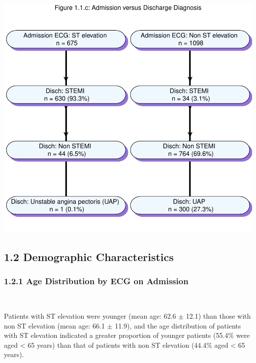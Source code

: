 \documentclass[
]{article}
\begin{document}
~

\includegraphics{‏‏ACSIS_2024_v1_with_trend_pdf_files/figure-latex/unnamed-chunk-8-1.pdf}

\pagebreak

\subsection{1.2 Demographic
Characteristics}\label{demographic-characteristics}

\subsubsection{1.2.1 Age Distribution by ECG on
Admission}\label{age-distribution-by-ecg-on-admission}

~

Patients with ST elevation were younger (mean age: 62.6 \(\pm\) 12.1)
than those with non ST elevation (mean age: 66.1 \(\pm\) 11.9), and the
age distribution of patients with ST elevation indicated a greater
proportion of younger patients (55.4\% were aged \textless{} 65 years)
than that of patients with non ST elevation (44.4\% aged \textless{} 65
years).

~
\end{document}
